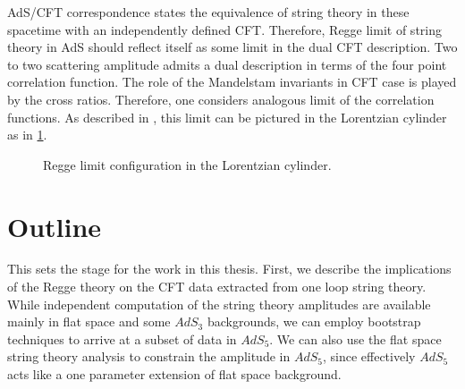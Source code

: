 AdS/CFT correspondence \cite{Maldacena:1997re} states the equivalence of string theory in these spacetime with an independently defined CFT.
Therefore, Regge limit of string theory in AdS should reflect itself as some limit in the dual CFT description.
Two to two scattering amplitude admits a dual description in terms of the four point correlation function.
The role of the Mandelstam invariants in CFT case is played by the cross ratios.
Therefore, one considers analogous limit of the correlation functions.
As described in \cite{Costa:2012cb}, this limit can be pictured in the Lorentzian cylinder as in \cref{fig:ReggeFig}.
\begin{figure}[htbp]
  \centering
  \caption{Regge limit configuration in the Lorentzian cylinder.}
  \label{fig:ReggeFig}
\end{figure}

\section*{Outline}
This sets the stage for the work in this thesis.
First, we describe the implications of the Regge theory on the CFT data extracted from one loop string theory.
While independent computation of the string theory amplitudes are available mainly in flat space and some $ AdS_3 $ backgrounds, we can employ bootstrap techniques to arrive at a subset of data in $ AdS_5 $.
We can also use the flat space string theory analysis to constrain the amplitude in $ AdS_5 $, since effectively $ AdS_5 $ acts like a one parameter extension of flat space background.

